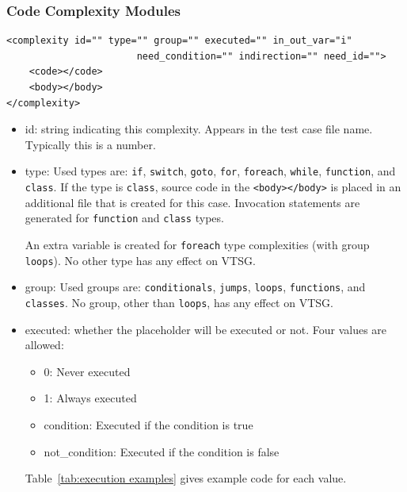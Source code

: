 \subsubsection{Code Complexity Modules}
\label{sec: complexity modules}

\begin{verbatim}
<complexity id="" type="" group="" executed="" in_out_var="i" 
                       need_condition="" indirection="" need_id="">
    <code></code>
    <body></body>
</complexity>
\end{verbatim}

\begin{itemize}
    \item id: string indicating this complexity.  Appears in the test case
      file name.  Typically this is a number.

    \item type: Used types are: \verb|if|, \verb|switch|, \verb|goto|,
    \verb|for|, \verb|foreach|, \verb|while|,
    \verb|function|, and \verb|class|.
    If the type is \verb|class|, source code in the \verb|<body></body>| is placed in
    an additional file that is created for this case.
    Invocation statements are generated for \verb|function| and \verb|class| types.

    An extra variable is created for \verb|foreach| type complexities (with group
    \verb|loops|).
    No other type has any effect on VTSG.

    \item group: Used groups are: \verb|conditionals|, \verb|jumps|,
    \verb|loops|, \verb|functions|, and \verb|classes|.
    No group, other than \verb|loops|, has any effect on VTSG.

    \item executed: whether the placeholder will be executed or not. Four 
    values are allowed:
    \begin{itemize}[nosep]
        \item 0: Never executed
        \item 1: Always executed
        \item condition:  Executed if the condition is true
        \item not\_condition:  Executed if the condition is false
    \end{itemize}
    Table~\ref{tab:execution examples} gives example code for each value.


\end{itemize}
